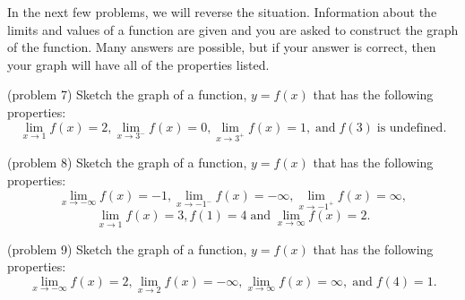 \documentclass[handout]{ximera}
\begin{document}
In the next few problems, we will reverse the situation.  Information about the limits and values of a function are given and you are asked to
construct the graph of the function.  Many answers are possible, but if your answer is correct, then your graph will have all of the properties listed.



\begin{problem}(problem 7)
Sketch the graph of a function, $y = f(x)$ that has the following properties:
\[
\lim_{x \to 1} f(x) = 2, \lim_{x \to 3^-} f(x) = 0,\lim_{x \to 3^+} f(x) = 1, \; \text{and}\;  f(3) \; \text{is undefined}.
\]
\end{problem}



\begin{problem}(problem 8)
Sketch the graph of a function, $y = f(x)$ that has the following properties:
\[
\lim_{x \to -\infty} f(x) = -1, \lim_{x \to -1^-} f(x) = -\infty,\lim_{x \to -1^+} f(x) = \infty, 
\]
\[
\lim_{x \to 1} f(x) = 3, f(1) = 4\; 
\text{and}\;  \lim_{x \to \infty} f(x) = 2.
\]
\end{problem}



\begin{problem}(problem 9)
Sketch the graph of a function, $y = f(x)$ that has the following properties:
\[
\lim_{x \to -\infty} f(x) = 2, \lim_{x \to 2} f(x) = -\infty,\lim_{x \to \infty} f(x) = \infty, \; \text{and} \; f(4) = 1.
\]
\end{problem}
\end{document}
